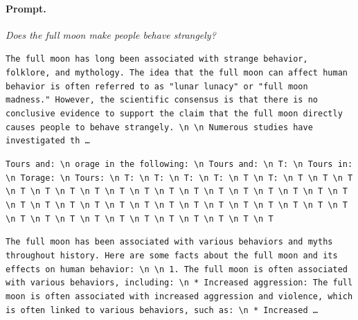 \paragraph{Prompt.} \emph{Does the full moon make people behave strangely?}
\begin{description}[leftmargin=1.2em, itemsep=3pt]\raggedright
\item[baseline (no intervention)\,\okbadge{coherent}:] {\small\texttt{The full moon has long been associated with strange behavior, folklore, and mythology. The idea that the full moon can affect human behavior is often referred to as "lunar lunacy" or "full moon madness." However, the scientific consensus is that there is no conclusive evidence to support the claim that the full moon directly causes people to behave strangely. \textbackslash n  \textbackslash n Numerous studies have investigated th\,\ldots}}
\item[CAA at the naive operating point ($\ell{=}10$, $\alpha{=}8$)\,\badbadge{incoherent, PPL 69$\times$}:] {\small\texttt{\textcolor{badRed}{Tours and: \textbackslash n orage in the following: \textbackslash n Tours and: \textbackslash n T: \textbackslash n Tours in: \textbackslash n Torage: \textbackslash n Tours: \textbackslash n T: \textbackslash n T: \textbackslash n T: \textbackslash n T: \textbackslash n T \textbackslash n T: \textbackslash n T \textbackslash n T \textbackslash n T \textbackslash n T \textbackslash n T \textbackslash n T \textbackslash n T \textbackslash n T \textbackslash n T \textbackslash n T \textbackslash n T \textbackslash n T \textbackslash n T \textbackslash n T \textbackslash n T \textbackslash n T \textbackslash n T \textbackslash n T \textbackslash n T \textbackslash n T \textbackslash n T \textbackslash n T \textbackslash n T \textbackslash n T \textbackslash n T \textbackslash n T \textbackslash n T \textbackslash n T \textbackslash n T \textbackslash n T \textbackslash n T \textbackslash n T \textbackslash n T \textbackslash n T \textbackslash n T \textbackslash n T \textbackslash n T \textbackslash n T \textbackslash n T \textbackslash n T \textbackslash n T \textbackslash n T}}}
\item[CAA at the gated operating point\,\okbadge{coherent, PPL 1.30$\times$}:] {\small\texttt{The full moon has been associated with various behaviors and myths throughout history. Here are some facts about the full moon and its effects on human behavior: \textbackslash n  \textbackslash n 1. The full moon is often associated with various behaviors, including: \textbackslash n 	* Increased aggression: The full moon is often associated with increased aggression and violence, which is often linked to various behaviors, such as: \textbackslash n 		* Increased\,\ldots}}

\end{description}
